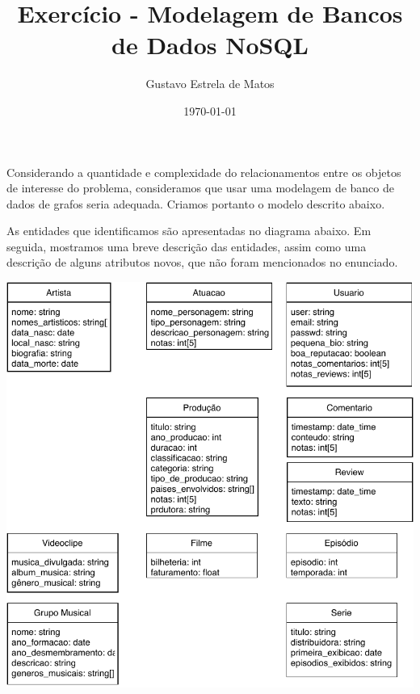 \documentclass[12pt]{article}
\begin{document}
\title{Exercício - Modelagem de Bancos de Dados NoSQL}
\author{\large Gustavo Estrela de Matos}
\date{\today}
\maketitle

Considerando a quantidade e complexidade do relacionamentos entre os
objetos de interesse do problema, consideramos que usar uma modelagem de
banco de dados de grafos seria adequada. Criamos portanto o modelo 
descrito abaixo.

As entidades que identificamos são apresentadas no diagrama abaixo. Em
seguida, mostramos uma breve descrição das entidades, assim como uma
descrição de alguns atributos novos, que não foram mencionados no 
enunciado.
\vspace{1em}

\begin{center}
\includegraphics[width=.8\linewidth]{entities_bdgrafos.pdf}
\end{center}
\end{document}
